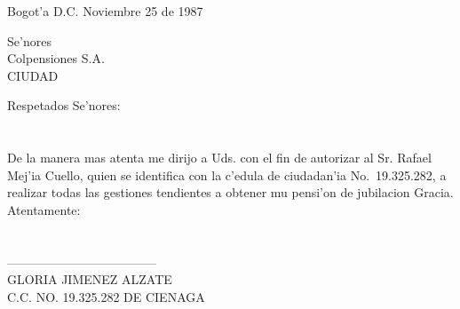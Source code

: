 \documentclass[11pt,oneside,letterpaper,notitlepage]{book}
\begin{document}
Bogot'a D.C. Noviembre 25 de 1987

\begin{flushleft}
Se'nores\\
Colpensiones S.A.\\
CIUDAD
\end{flushleft}

Respetados Se'nores:\\\\\\
De la manera mas atenta me dirijo a Uds. con el fin de autorizar al Sr. Rafael Mej'ia Cuello, quien se identifica con la c'edula de ciudadan'ia No.~19.325.282, a realizar todas las gestiones tendientes a obtener mu pensi'on de jubilacion Gracia.\\
Atentamente:\\\\\\
------------------------------------\\
GLORIA JIMENEZ ALZATE\\
C.C. NO. 19.325.282 DE CIENAGA
\end{document}
